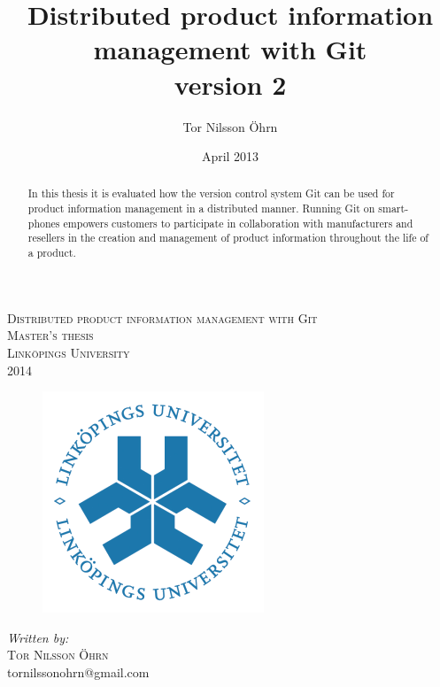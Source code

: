 \documentclass[12pt,a4paper]{article}
\title{Distributed product information management with Git \\ version 2}
\author{Tor Nilsson Öhrn}
\date{April 2013}
\begin{document}
\begin{titlepage}
\begin{center}


\textsc{\LARGE Distributed product information management with Git}\\[0.2cm]
\textsc{\Large Master's thesis \\ Linköpings University \\  2014}\\[0.5cm]

\begin{figure}
    \begin{center}
        \includegraphics[scale=2.0]{images/liu_logo.png}
    \end{center}
    \vspace{1.0cm}
\end{figure}

\emph{Written by:}\\
\textsc{Tor Nilsson Öhrn}\\
tornilssonohrn@gmail.com\\[0.5cm]

\end{center}
\end{titlepage}

\tableofcontents
{}
\clearpage

\setcounter{page}{1}

\clearpage 

\begin{abstract}
In this thesis it is evaluated how the version control system Git can be used for product information management in a distributed manner. Running Git on smart-phones empowers customers to participate in collaboration with manufacturers and resellers in the creation and management of product information throughout the life of a product.

\end{abstract}
\end{document}
